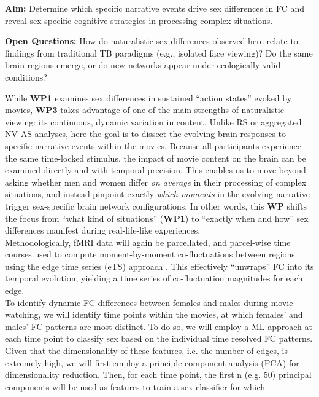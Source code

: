 \documentclass[11pt,a4paper]{article}
\begin{document}
\textbf{Aim:} Determine which specific narrative events drive sex differences in FC 
and reveal sex-specific cognitive strategies in processing complex situations.  

\textbf{Open Questions:} How do naturalistic sex differences observed here relate to findings 
from traditional TB paradigms (e.g., isolated face viewing)? Do the same brain regions emerge, 
or do new networks appear under ecologically valid conditions?  

While \textbf{WP1} examines sex differences in sustained “action states” evoked by movies, 
\textbf{WP3} takes advantage of one of the main strengths of naturalistic viewing: its continuous, 
dynamic variation in content. Unlike RS or aggregated NV-AS analyses, here the goal is to dissect 
the evolving brain responses to specific narrative events within the movies. 
Because all participants experience the same time-locked stimulus, the impact of movie content on the 
brain can be examined directly and with temporal precision. This enables us to move beyond asking whether 
men and women differ \textit{on average} in their processing of complex situations, and 
instead pinpoint exactly \textit{which moments} in the evolving narrative trigger sex-specific brain network configurations. 
In other words, this \textbf{WP} shifts the focus from “what kind of situations” (\textbf{WP1}) to “exactly when and how” 
sex differences manifest during real-life-like experiences.\\  
Methodologically, fMRI data will again be parcellated, and parcel-wise time courses used to compute 
moment-by-moment co-fluctuations between regions using the edge time series (eTS) approach 
\parencite{betzelLivingEdgeNetwork2023,faskowitzEdgecentricFunctionalNetwork2020a}. 
This effectively “unwraps” FC into its temporal evolution, yielding a time series of 
co-fluctuation magnitudes for each edge.\\
To identify dynamic FC differences between females and males during movie watching, we will identify
time points within the movies, at which females' and males' FC patterns are most distinct. To do so, we
will employ a ML approach at each time point to classify sex based on the individual time resolved FC
patterns. Given that the dimensionality of these features, i.e. the number of edges, is extremely high, we
will first employ a principle component analysis (PCA) for dimensionality reduction. Then, for each time
point, the first n (e.g. 50) principal components will be used as features to train a sex classifier for which
\end{document}
